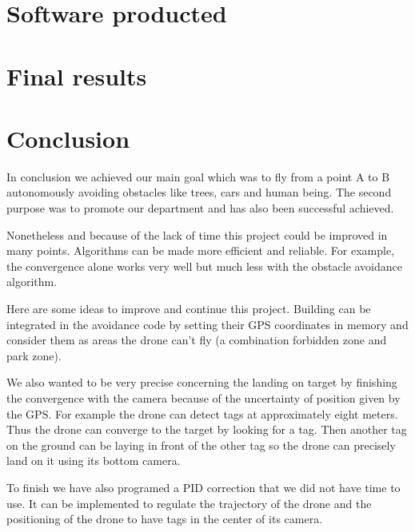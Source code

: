 \documentclass[10pt,a4paper,titlepage]{report}
\begin{document}
\chapter{Software producted}

\chapter{Final results}


\chapter{Conclusion}
In conclusion we achieved our main goal which was to fly from a point A to B autonomously avoiding obstacles like trees, cars and human being. The second purpose was to promote our department and has also been successful achieved.

Nonetheless and because of the lack of time this project could be improved in many points. Algorithms can be made more efficient and reliable. For example, the convergence alone works very well but much less with the obstacle avoidance algorithm.

Here are some ideas to improve and continue this project. Building can be integrated in the avoidance code by setting their GPS coordinates in memory and consider them as areas the drone can’t fly (a combination forbidden zone and park zone).

We also wanted to be very precise concerning the landing on target by finishing the convergence with the camera because of the uncertainty of position given by the GPS. For example the drone can detect tags at approximately eight meters. Thus the drone can converge to the target by looking for a tag. Then another tag on the ground can be laying in front of the other tag so the drone can precisely land on it using its bottom camera.

To finish we have also programed a PID correction that we did not have time to use. It can be implemented to regulate the trajectory of the drone and the positioning of the drone to have tags in the center of its camera.
\end{document}
